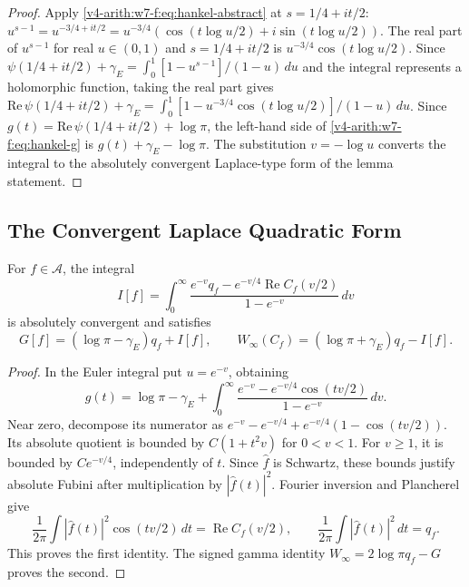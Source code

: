 \begin{proof}
Apply \eqref{v4-arith:w7-f:eq:hankel-abstract} at \(s=1/4+it/2\):
\(u^{s-1}=u^{-3/4+it/2}=u^{-3/4}(\cos(t\log u/2)+i\sin(t\log u/2))\).
The real part of \(u^{s-1}\) for real \(u\in(0,1)\) and
\(s=1/4+it/2\) is \(u^{-3/4}\cos(t\log u/2)\). Since
\(\psi(1/4+it/2)+\gamma_{E}=\int_{0}^{1}[1-u^{s-1}]/(1-u)\,du\)
and the integral represents a holomorphic function, taking the real
part gives
\(\mathrm{Re}\,\psi(1/4+it/2)+\gamma_{E}=\int_{0}^{1}[1-u^{-3/4}\cos(t\log u/2)]/(1-u)\,du\).
Since \(g(t)=\mathrm{Re}\,\psi(1/4+it/2)+\log\pi\), the left-hand side of
\eqref{v4-arith:w7-f:eq:hankel-g} is \(g(t)+\gamma_{E}-\log\pi\). The
substitution \(v=-\log u\) converts the integral to the absolutely
convergent Laplace-type form of the lemma statement.
\end{proof}

\subsection{The Convergent Laplace Quadratic Form}
\label{v4-arith:w7-f:hankel:laplace}
\begin{proposition}
\label{v4-arith:w7-f:prop:laplace-W-infty}
For \(f\in\mathscr A\), the integral
\[
 I[f]=\int_0^\infty
 \frac{e^{-v}q_f-e^{-v/4}\operatorname{Re}C_f(v/2)}{1-e^{-v}}\,dv
\]
is absolutely convergent and satisfies
\begin{equation}
\label{v4-arith:w7-f:eq:laplace-W-infty}
 G[f]=(\log\pi-\gamma_E)q_f+I[f],\qquad
 W_\infty(C_f)=(\log\pi+\gamma_E)q_f-I[f].
\end{equation}
\end{proposition}
\begin{proof}
In the Euler integral put \(u=e^{-v}\), obtaining
\[
 g(t)=\log\pi-\gamma_E+
 \int_0^\infty\frac{e^{-v}-e^{-v/4}\cos(tv/2)}{1-e^{-v}}\,dv.
\]
Near zero, decompose its numerator as
\(e^{-v}-e^{-v/4}+e^{-v/4}(1-\cos(tv/2))\).
Its absolute quotient is bounded by \(C(1+t^2v)\) for \(0<v<1\).
For \(v\ge1\), it is bounded by \(C e^{-v/4}\), independently of
\(t\). Since \(\widehat f\) is Schwartz, these bounds justify
absolute Fubini after multiplication by \(|\widehat f(t)|^2\).
Fourier inversion and Plancherel give
\[
 \frac1{2\pi}\int|\widehat f(t)|^2\cos(tv/2)\,dt
 =\operatorname{Re}C_f(v/2),\qquad
 \frac1{2\pi}\int|\widehat f(t)|^2\,dt=q_f.
\]
This proves the first identity. The signed gamma identity
\(W_\infty=2\log\pi q_f-G\) proves the second.
\end{proof}

